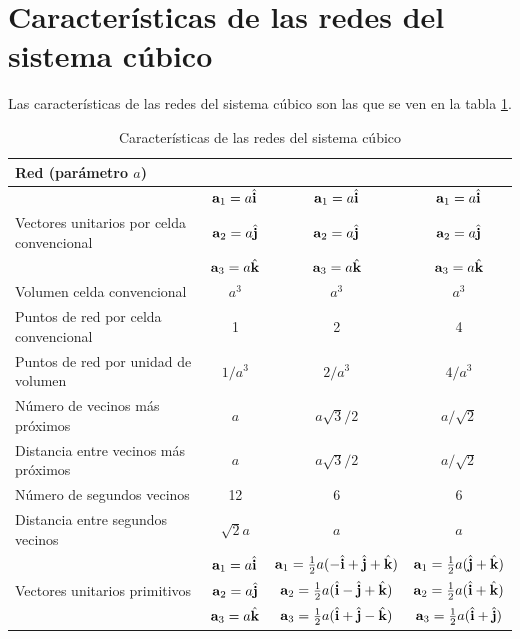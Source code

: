 \section{Características de las redes del sistema cúbico}

Las características de las redes del sistema cúbico son las que se ven en la tabla \ref{Tab:01-03}.

\begin{table}[h!] \centering
	\begin{tabular}{lccc}
		Red (parámetro $a$) & \sc & \fcc & \bcc \\ \hline 
		& $\mathbf{a}_1=a\hat{\mathbf{i}}$ &  $\mathbf{a}_1=a\hat{\mathbf{i}}$ & $\mathbf{a}_1=a\hat{\mathbf{i}}$  \\		
 		Vectores unitarios por celda convencional  & $\mathbf{a}_2=a\hat{\mathbf{j}}$  & $\mathbf{a}_2=a\hat{\mathbf{j}}$  &  $\mathbf{a}_2=a\hat{\mathbf{j}}$ \\
 		& $\mathbf{a}_3=a\hat{\mathbf{k}}$ & $\mathbf{a}_3=a\hat{\mathbf{k}}$  & $\mathbf{a}_3=a\hat{\mathbf{k}}$ \\ \hline
 		Volumen celda convencional & $a^3$ & $a^3$ & $a^3$ \\ \hline
 		Puntos de red por celda convencional & 1 & 2 & 4 \\ \hline
 		Puntos de red por unidad de volumen & $1/a^3$ &  $2/a^3$ &  $4/a^3$ \\ \hline
 		Número de vecinos más próximos & $a$ & $a\sqrt{3}/2$ & $a/\sqrt{2}$ \\ \hline
 		Distancia entre vecinos más próximos & $a$ & $a\sqrt{3}/2$ & $a/\sqrt{2}$ \\ \hline
 		Número de segundos vecinos & 12 & 6 & 6 \\ \hline
 		Distancia entre segundos vecinos & $\sqrt{2} a$ & $a$ & $a$ \\ \hline
 		 & $\mathbf{a}_1=a\hat{\mathbf{i}}$ &  $\mathbf{a}_1=\frac{1}{2} a (-\hat{\mathbf{i}}+\hat{\mathbf{j}}+\hat{\mathbf{k}})$ &   $\mathbf{a}_1=\frac{1}{2} a (\hat{\mathbf{j}}+\hat{\mathbf{k}})$  \\
 		 Vectores unitarios primitivos &$\mathbf{a}_2=a\hat{\mathbf{j}}$ &  $\mathbf{a}_2=\frac{1}{2} a (\hat{\mathbf{i}}-\hat{\mathbf{j}}+\hat{\mathbf{k}})$ &   $\mathbf{a}_2=\frac{1}{2} a (\hat{\mathbf{i}}+\hat{\mathbf{k}})$  \\
 		 &$\mathbf{a}_3=a\hat{\mathbf{k}}$ &  $\mathbf{a}_3=\frac{1}{2} a (\hat{\mathbf{i}}+\hat{\mathbf{j}}-\hat{\mathbf{k}})$ &   $\mathbf{a}_3=\frac{1}{2} a (\hat{\mathbf{i}}+\hat{\mathbf{j}})$  \\ \hline		
	\end{tabular}
	\caption{Características de las redes del sistema cúbico}
	\label{Tab:01-03}
\end{table} 
